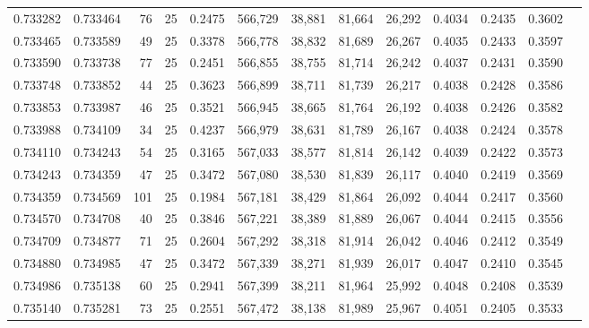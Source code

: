 \begin{tabular}{rrrrrrrrrrrrr}
0.733282 & 0.733464 &    76 &  25 &                                     0.2475 & 566,729 &  38,881 &  81,664 &  26,292 & 0.4034 & 0.2435 & 0.3602 \\
0.733465 & 0.733589 &    49 &  25 &                                     0.3378 & 566,778 &  38,832 &  81,689 &  26,267 & 0.4035 & 0.2433 & 0.3597 \\
0.733590 & 0.733738 &    77 &  25 &                                     0.2451 & 566,855 &  38,755 &  81,714 &  26,242 & 0.4037 & 0.2431 & 0.3590 \\
0.733748 & 0.733852 &    44 &  25 &                                     0.3623 & 566,899 &  38,711 &  81,739 &  26,217 & 0.4038 & 0.2428 & 0.3586 \\
0.733853 & 0.733987 &    46 &  25 &                                     0.3521 & 566,945 &  38,665 &  81,764 &  26,192 & 0.4038 & 0.2426 & 0.3582 \\
0.733988 & 0.734109 &    34 &  25 &                                     0.4237 & 566,979 &  38,631 &  81,789 &  26,167 & 0.4038 & 0.2424 & 0.3578 \\
0.734110 & 0.734243 &    54 &  25 &                                     0.3165 & 567,033 &  38,577 &  81,814 &  26,142 & 0.4039 & 0.2422 & 0.3573 \\
0.734243 & 0.734359 &    47 &  25 &                                     0.3472 & 567,080 &  38,530 &  81,839 &  26,117 & 0.4040 & 0.2419 & 0.3569 \\
0.734359 & 0.734569 &   101 &  25 &                                     0.1984 & 567,181 &  38,429 &  81,864 &  26,092 & 0.4044 & 0.2417 & 0.3560 \\
0.734570 & 0.734708 &    40 &  25 &                                     0.3846 & 567,221 &  38,389 &  81,889 &  26,067 & 0.4044 & 0.2415 & 0.3556 \\
0.734709 & 0.734877 &    71 &  25 &                                     0.2604 & 567,292 &  38,318 &  81,914 &  26,042 & 0.4046 & 0.2412 & 0.3549 \\
0.734880 & 0.734985 &    47 &  25 &                                     0.3472 & 567,339 &  38,271 &  81,939 &  26,017 & 0.4047 & 0.2410 & 0.3545 \\
0.734986 & 0.735138 &    60 &  25 &                                     0.2941 & 567,399 &  38,211 &  81,964 &  25,992 & 0.4048 & 0.2408 & 0.3539 \\
0.735140 & 0.735281 &    73 &  25 &                                     0.2551 & 567,472 &  38,138 &  81,989 &  25,967 & 0.4051 & 0.2405 & 0.3533 \\

\end{tabular}
